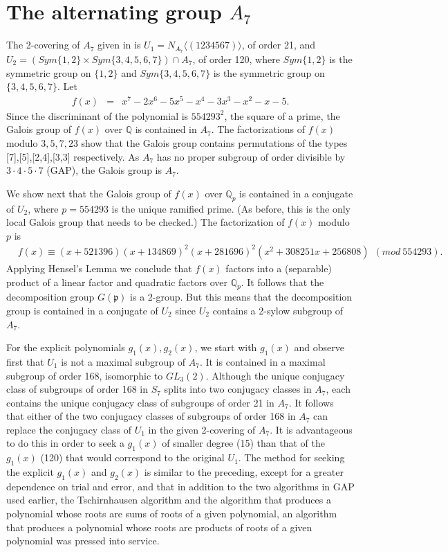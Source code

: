 \documentclass[reqno,12pt]{amsart}
\theoremstyle{remark}
\theoremstyle{definition}
\theoremstyle{citing}
\numberwithin{theorem}{section}
\numberwithin{equation}{section}
\begin{document}
\section{The alternating group $A_{7}$}

The 2-covering of $A_7$ given in \cite{Bubboloni} is $U_1=N_{A_7}\langle(1234567)\rangle$, of order 21, and $U_2=(Sym\{1,2\}\times Sym\{3,4,5,6,7\})\cap A_7$, of order 120, where $Sym\{1,2\}$ is the symmetric group on $\{1,2\}$ and $Sym\{3,4,5,6,7\}$ is the symmetric group on $\{3,4,5,6,7\}$. Let \begin{eqnarray*}
f(x) & = & x^{7}-2x^{6}-5x^{5}-x^{4}-3x^{3}-x^{2}-x-5.\end{eqnarray*}
Since the discriminant
of the polynomial is $554293^{2}$, the square of a prime, the Galois group of $f(x)$ over $\mathbb{Q}$ is contained
in $A_{7}$.  The factorizations of $f(x)$ modulo $3,5,7,23$ show that the Galois group contains permutations of the types [7],[5],[2,4],[3,3] respectively.  As $A_7$ has no proper subgroup of order divisible by $3\cdot 4 \cdot 5 \cdot 7$ (GAP), the Galois group is $A_7$.

We show next that the Galois group of $f(x)$ over $\mathbb{Q}_{p}$
is contained in a conjugate of $U_{2}$, where $p=554293$ is the unique ramified prime. (As before, this is the only local Galois group that needs to be checked.)  The factorization of $f(x)$ modulo $p$ is  \begin{eqnarray*}
 & f(x)\equiv(x+521396)(x+134869)^{2}(x+281696)^{2}(x^{2}+308251x+256808)\ \ (mod\ 554293).\end{eqnarray*}
Applying Hensel's Lemma we conclude that $f(x)$ factors into a (separable) product
of  a linear factor and  quadratic factors
over $\mathbb{Q}_{p}$. It follows that the decomposition group $G(\mathfrak{p})$
is a 2-group. But this means that the decomposition group is contained
in a conjugate of $U_{2}$ since $U_{2}$ contains a 2-sylow subgroup
of $A_{7}$.

For the explicit polynomials $g_1(x),g_2(x)$, we start with $g_1(x)$ and observe first that $U_1$ is not a maximal subgroup of $A_7$.  It is contained in a maximal subgroup of order 168, isomorphic to $GL_3(2)$.  Although the unique conjugacy class of  subgroups of order 168 in $S_7$ splits into two conjugacy classes in $A_7$, each contains the unique conjugacy class of subgroups of order 21 in $A_7$.  It follows that either of the two conjugacy classes of subgroups of order 168 in $A_7$ can replace the conjugacy class of $U_1$ in the given 2-covering of $A_7$.  It is advantageous to do this in order to seek a $g_1(x)$ of smaller degree (15) than that of the $g_1(x)$ (120) that would correspond to the original $U_1$.  The method for seeking the explicit $g_1(x)$ and $g_2(x)$ is similar to the preceding, except for a greater dependence on trial and error, and that in addition to the two algorithms in GAP used earlier, the Tschirnhausen algorithm and the algorithm that  produces a polynomial whose roots are sums of roots of a given polynomial, an algorithm that  produces a polynomial whose roots are products of roots of a given polynomial was pressed into service.
\end{document}
